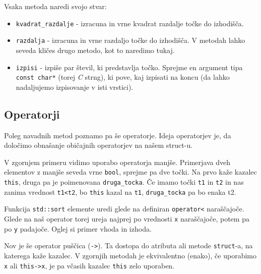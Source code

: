 \noindent Vsaka metoda naredi svojo stvar:
\begin{itemize}
	\item \verb+kvadrat_razdalje+ - izracuna in vrne kvadrat razdalje to\v cke do
	izhodi\v s\v ca.
	\item \verb+razdalja+ - izracuna in vrne razdaljo to\v cke do izhodi\v s\v ca.
	V metodah lahko seveda kli\v ces drugo metodo, kot to naredimo tukaj.
	\item \verb+izpisi+ - izpi\v se par \v stevil, ki predstavlja to\v cko.
	Sprejme en argument tipa \verb+const char*+ (torej {\em C} strng), ki pove, kaj
	izpisati na koncu (da lahko nadaljujemo izpisovanje v isti vrstici).
\end{itemize}


\subsection{Operatorji}

Poleg navadnih metod poznamo pa \v se operatorje. Ideja operatorjev je, da
dolo\v cimo obna\v sanje obi\v cajnih operatorjev na na\v sem struct-u.

\begin{examples}


\begin{inout}
\tcblower
\end{inout}

\end{examples}

V zgornjem primeru vidimo uporabo operatorja manj\v se. Primerjava dveh
elementov z manj\v se seveda vrne \verb+bool+, sprejme pa dve to\v cki. Na prvo
ka\v ze kazalec \verb+this+, druga pa je poimenovana \verb+druga_tocka+. \v Ce
imamo to\v cki \verb+t1+ in \verb+t2+ in nas zanima vrednost \verb+t1<t2+, bo
\verb+this+ kazal na \verb+t1+, \verb+druga_tocka+ pa bo enaka t2. 

Funkcija \verb+std::sort+ elemente uredi glede na definiran \verb+operator<+ nara\v s\v cajo\v ce.
Glede na na\v s operator torej ureja najprej po vrednosti \verb+x+ nara\v s\v
cajo\v ce, potem pa po \verb+y+ padajo\v ce. Oglej si primer vhoda in izhoda.

Nov je \v se operator pu\v s\v cica (\verb+->+). Ta dostopa do atributa ali
metode \verb+struct+-a, na katerega ka\v ze kazalec. V zgornjih metodah je
ekvivalentno (enako), \v ce uporabimo \verb+x+ ali \verb+this->x+, je pa v\v
casih kazalec \verb+this+ zelo uporaben.

